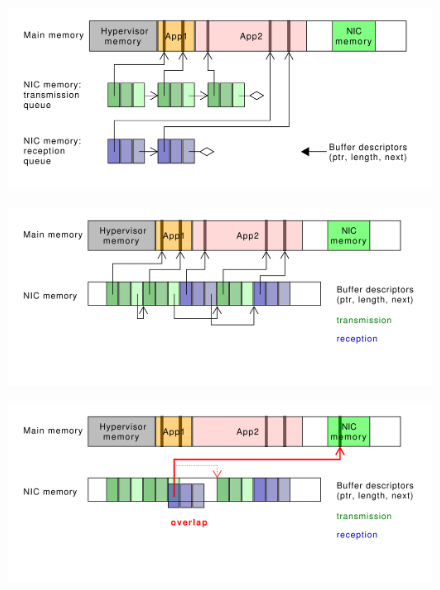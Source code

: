 \documentclass{beamer}
\begin{document}
\begin{frame}
    \begin{figure}
        \includegraphics[width=\textwidth]{figures/nic-bd.pdf}
        \label{nic_bd}
    \end{figure}
\end{frame}

\begin{frame}
    \begin{figure}
        \includegraphics[width=\textwidth]{figures/nic-bd-in_mem.pdf}
        \label{nic_bd_inmem}
    \end{figure}
\end{frame}

\begin{frame}
    \begin{figure}
        \includegraphics[width=\textwidth]{figures/nic-bd-in_mem-overlap.pdf}
        \label{nic_bd_inmem_overlap}
    \end{figure}
\end{frame}
\end{document}
